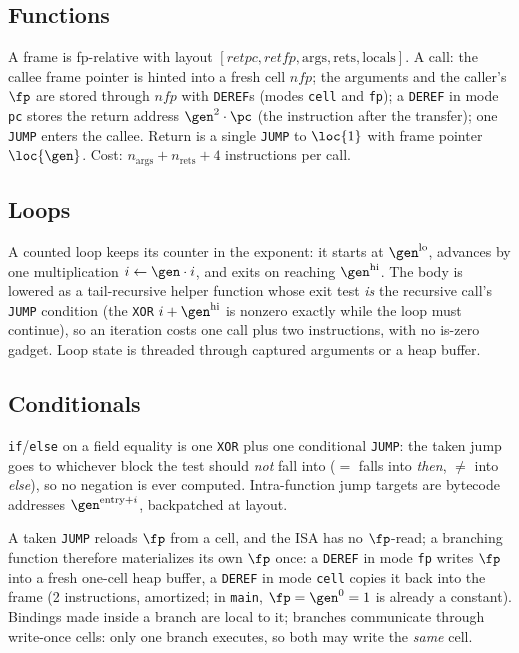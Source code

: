 \subsection{Functions}\label{sec:prog-functions}

A frame is fp-relative with layout $[\mathit{retpc},\mathit{retfp},\mathrm{args},\mathrm{rets},\mathrm{locals}]$. A call: the callee frame pointer is hinted into a fresh cell $\mathit{nfp}$; the arguments and the caller's $\fp$ are stored through $\mathit{nfp}$ with \texttt{DEREF}s (modes \texttt{cell} and \texttt{fp}); a \texttt{DEREF} in mode \texttt{pc} stores the return address $\gen^{2}\cdot\pc$ (the instruction after the transfer); one \texttt{JUMP} enters the callee. Return is a single \texttt{JUMP} to $\loc{1}$ with frame pointer $\loc{\gen}$. Cost: $n_{\mathrm{args}}+n_{\mathrm{rets}}+4$ instructions per call.

\subsection{Loops}\label{sec:prog-loops}

A counted loop keeps its counter in the exponent: it starts at $\gen^{\mathrm{lo}}$, advances by one multiplication $i\gets\gen\cdot i$, and exits on reaching $\gen^{\mathrm{hi}}$. The body is lowered as a tail-recursive helper function whose exit test \emph{is} the recursive call's \texttt{JUMP} condition (the \texttt{XOR} $i+\gen^{\mathrm{hi}}$ is nonzero exactly while the loop must continue), so an iteration costs one call plus two instructions, with no is-zero gadget. Loop state is threaded through captured arguments or a heap buffer.

\subsection{Conditionals}\label{sec:prog-conditionals}

\texttt{if}/\texttt{else} on a field equality is one \texttt{XOR} plus one conditional \texttt{JUMP}: the taken jump goes to whichever block the test should \emph{not} fall into ($=$ falls into \emph{then}, $\neq$ into \emph{else}), so no negation is ever computed. Intra-function jump targets are bytecode addresses $\gen^{\mathrm{entry}+i}$, backpatched at layout.

A taken \texttt{JUMP} reloads $\fp$ from a cell, and the ISA has no $\fp$-read; a branching function therefore materializes its own $\fp$ once: a \texttt{DEREF} in mode \texttt{fp} writes $\fp$ into a fresh one-cell heap buffer, a \texttt{DEREF} in mode \texttt{cell} copies it back into the frame (2 instructions, amortized; in \texttt{main}, $\fp=\gen^{0}=1$ is already a constant). Bindings made inside a branch are local to it; branches communicate through write-once cells: only one branch executes, so both may write the \emph{same} cell.

